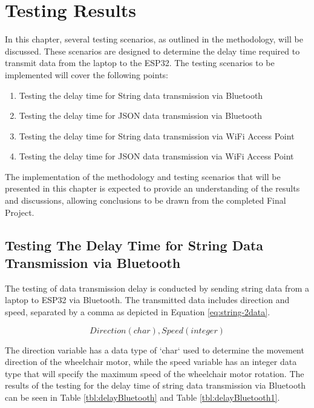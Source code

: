 \section{Testing Results}
\label{sec:hasil pengujian}

In this chapter, several testing scenarios, as outlined in the methodology, will be discussed. These scenarios are designed to determine the delay time required to transmit data from the laptop to the ESP32. The testing scenarios to be implemented will cover the following points:

\begin{enumerate}
  \item Testing the delay time for String data transmission via Bluetooth
  \item Testing the delay time for JSON data transmission via Bluetooth
  \item Testing the delay time for String data transmission via WiFi Access Point
  \item Testing the delay time for JSON data transmission via WiFi Access Point
\end{enumerate}

The implementation of the methodology and testing scenarios that will be presented in this chapter is expected to provide an understanding of the results and discussions, allowing conclusions to be drawn from the completed Final Project.

\subsection{Testing The Delay Time for String Data Transmission via Bluetooth}

The testing of data transmission delay is conducted by sending string data from a laptop to ESP32 via Bluetooth. The transmitted data includes direction and speed, separated by a comma as depicted in Equation \ref{eq:string-2data}.

\begin{equation}
  \label{eq:string-2data}
    Direction(char),Speed(integer)
\end{equation}

The direction variable has a data type of `char` used to determine the movement direction of the wheelchair motor, while the speed variable has an integer data type that will specify the maximum speed of the wheelchair motor rotation. The results of the testing for the delay time of string data transmission via Bluetooth can be seen in Table \ref{tbl:delayBluetooth} and Table \ref{tbl:delayBluetooth1}.

